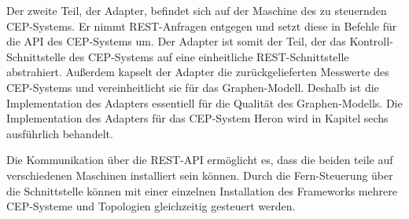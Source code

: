 Der zweite Teil, der Adapter, befindet sich auf der Maschine des zu steuernden CEP-Systems.
Er nimmt REST-Anfragen entgegen und setzt diese in Befehle für die API des CEP-Systems um.
Der Adapter ist somit der Teil, der das Kontroll-Schnittstelle des CEP-Systems auf eine einheitliche REST-Schnittstelle abstrahiert.
Außerdem kapselt der Adapter die zurückgelieferten Messwerte des CEP-Systems und vereinheitlicht sie für das Graphen-Modell.
Deshalb ist die Implementation des Adapters essentiell für die Qualität des Graphen-Modells.
Die Implementation des Adapters für das CEP-System Heron wird in Kapitel sechs ausführlich behandelt.

Die Kommunikation über die REST-API ermöglicht es, dass die beiden teile auf verschiedenen Maschinen installiert sein können.
Durch die Fern-Steuerung über die Schnittstelle können mit einer einzelnen Installation des Frameworks mehrere CEP-Systeme und Topologien gleichzeitig gesteuert werden.



















